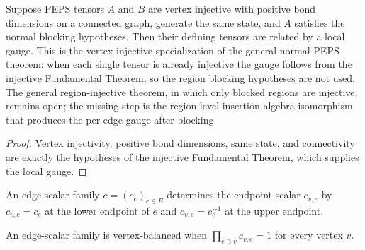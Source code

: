 \begin{theorem}%
    \label{thm:fundamentalTheorem_normalPEPS_of_vertexInjective}
    \leanok
    Suppose PEPS tensors $A$ and $B$ are vertex injective with positive bond
    dimensions on a connected graph, generate the same state, and $A$ satisfies
    the normal blocking hypotheses. Then their defining tensors are related by
    a local gauge.
    This is the vertex-injective specialization of the general normal-PEPS
    theorem: when each single tensor is already injective the gauge follows
    from the injective Fundamental Theorem, so the region blocking hypotheses
    are not used. The general region-injective theorem, in which only blocked
    regions are injective, remains open; the missing step is the
    region-level insertion-algebra isomorphism that produces the per-edge gauge
    after blocking.
\end{theorem}
\begin{proof}\leanok
    Vertex injectivity, positive bond dimensions, same state, and connectivity
    are exactly the hypotheses of the injective Fundamental Theorem, which
    supplies the local gauge.
\end{proof}

\begin{definition}%
    \label{def:edgeScalarAt}
    \leanok
    An edge-scalar family $c=(c_e)_{e\in E}$ determines the endpoint scalar
    $c_{v,e}$ by $c_{v,e}=c_e$ at the lower endpoint of $e$ and
    $c_{v,e}=c_e^{-1}$ at the upper endpoint.
\end{definition}

\begin{definition}%
    \label{def:IsVertexBalanced}
    \leanok
    An edge-scalar family is vertex-balanced when
    $\prod_{e\ni v} c_{v,e}=1$ for every vertex $v$.
\end{definition}
